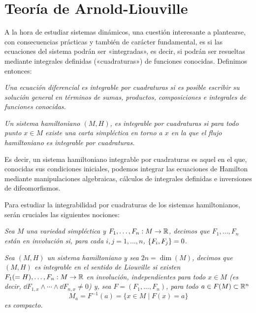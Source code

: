 \section{Teoría de Arnold-Liouville}\label{sec:arnoldliouville}
A la hora de estudiar sistemas dinámicos, una cuestión interesante a plantearse, con consecuencias prácticas y también de carácter fundamental, es si las ecuaciones del sistema podrán ser «integradas», es decir, si podrán ser resueltas mediante integrales definidas («cuadraturas») de funciones conocidas. Definimos entonces:
\begin{defn}
  \em
  Una ecuación diferencial es \emph{integrable por cuadraturas} si es posible escribir su solución general en términos de sumas, productos, composiciones e integrales de funciones conocidas. 
\end{defn}
\begin{defn}
  \em
  Un sistema hamiltoniano $(M,H)$, es \emph{integrable por cuadraturas} si para todo punto $x\in M$ existe una carta simpléctica en torno a $x$ en la que el flujo hamiltoniano es integrable por cuadraturas.
\end{defn}
Es decir, un sistema hamiltoniano integrable por cuadraturas es aquel en el que, conocidas sus condiciones iniciales, podemos integrar las ecuaciones de Hamilton mediante manipulaciones algebraicas, cálculos de integrales definidas e inversiones de difeomorfismos.

Para estudiar la integrabilidad por cuadraturas de los sistemas hamiltonianos, serán cruciales las siguientes nociones:
\begin{defn}
  \em
  Sea $M$ una variedad simpléctica y $F_1,\dots,F_n:M \rightarrow \mathbb{R}$, decimos que $F_1,\dots,F_n$ \emph{están en involución} si, para cada $i,j=1,\dots,n$, $\left\lbrace F_i,F_j\right\rbrace=0$.
\end{defn}
\begin{defn}
  \em
  Sea $(M,H)$ un sistema hamiltoniano y sea $2n=\dim(M)$, decimos que $(M,H)$ \emph{es integrable en el sentido de Liouville} si existen $F_1(=H),\dots,F_n:M \rightarrow \mathbb{R}$ en involución, independientes para todo $x \in M$ (es decir, $\dd F_{1,x}\wedge \cdots \wedge \dd F_{n,x} \neq 0$) y, sea $F=(F_1,\dots,F_n)$, para todo $a \in F(M)\subset \mathbb{R}^n$
  \[
    M_a=F^{-1}(a)=\{x \in M \mid F(x)=a\}
  \]
  es compacto.
\end{defn}

